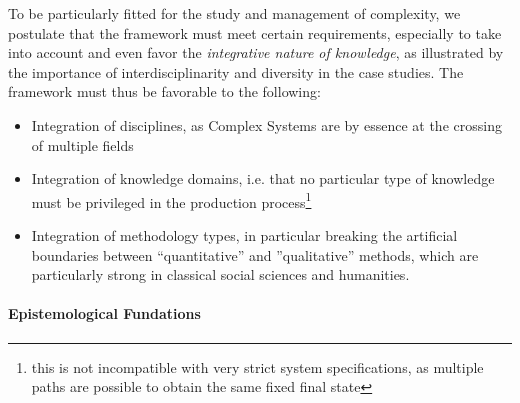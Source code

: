 \documentclass[runningheads,a4paper]{llncs2e/llncs}
\begin{document}
To be particularly fitted for the study and management of complexity, we postulate that the framework must meet certain requirements, especially to take into account and even favor the \emph{integrative nature of knowledge}, as illustrated by the importance of interdisciplinarity and diversity in the case studies. The framework must thus be favorable to the following:
\begin{itemize}
\item Integration of disciplines, as Complex Systems are by essence at the crossing of multiple fields
\item Integration of knowledge domains, i.e. that no particular type of knowledge must be privileged in the production process\footnote{this is not incompatible with very strict system specifications, as multiple paths are possible to obtain the same fixed final state}
\item Integration of methodology types, in particular breaking the artificial boundaries between ``quantitative'' and ''qualitative'' methods, which are particularly strong in classical social sciences and humanities.
\end{itemize}




\paragraph{Epistemological Fundations}

\end{document}
